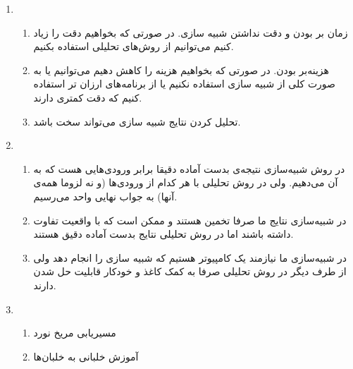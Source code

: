 \begin{enumerate}
    \item \begin{enumerate}
        \item زمان بر بودن و دقت نداشتن شبیه سازی. در صورتی که بخواهیم دقت را زیاد کنیم می‌توانیم از روش‌های تحلیلی استفاده بکنیم.
        \item هزینه‌بر بودن. در صورتی که بخواهیم هزینه را کاهش دهیم می‌توانیم یا به صورت کلی از شبیه سازی استفاده نکنیم یا از برنامه‌های ارزان تر استفاده کنیم که دقت کمتری دارند.
        \item تحلیل کردن نتایج شبیه سازی می‌تواند سخت باشد.
    \end{enumerate}
    \item \begin{enumerate}
        \item در روش شبیه‌سازی نتیجه‌ی بدست آماده دقیقا برابر ورودی‌هایی هست که به آن می‌دهیم. ولی در روش تحلیلی با هر کدام از ورودی‌ها (و نه لزوما همه‌ی آنها) به جواب نهایی واحد می‌رسیم.
        \item در شبیه‌سازی نتایج ما صرفا تخمین هستند و ممکن است که با واقعیت تفاوت داشته باشند اما در روش تحلیلی نتایج بدست آماده دقیق هستند.
        \item در شبیه‌سازی ما نیازمند یک کامپیوتر هستیم که شبیه سازی را انجام دهد ولی از طرف دیگر در روش تحلیلی صرفا به کمک کاغذ و خودکار قابلیت حل شدن دارند.
    \end{enumerate}
    \item \begin{enumerate}
        \item مسیریابی مریخ نورد
        \item آموزش خلبانی به خلبان‌ها
    \end{enumerate}
\end{enumerate}








